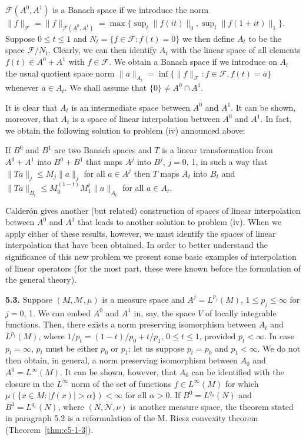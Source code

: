 $\mathcal{F}(A^{0}, A^{1})$ is a Banach space if we introduce the norm
$\|f\|_{\mathcal{F}} = \|f\|_{\mathcal{F}(A^{0}, A^{1})} = \max\{\sup_{t}\|f(it)\|_{0}, \sup_{t}\|f(1 + it)\|_{1}\}$.
Suppose $0 \leq t \leq 1$ and $N_{t} = \{f \in \mathcal{F} : f(t) = 0\}$ we
then define $A_{t}$ to be the space $\mathcal{F}/N_{t}$. Clearly, we can then
identify $A_{t}$ with the linear space of all elements
$f(t) \in A^{0} + A^{1}$ with $f \in \mathcal{F}$. We obtain a Banach space if
we introduce on $A_{t}$ the usual quotient space norm
$\|a\|_{A_{t}} = \inf\{\|f\|_{\mathcal{F}} : f \in \mathcal{F}, f(t) = a\}$
whenever $a \in A_{t}$. We shall assume that $\{0\} \neq A^{0} \cap A^{1}$.

It is clear that $A_{t}$ is an intermediate space between $A^{0}$ and $A^{1}$.
It can be shown, moreover, that $A_{t}$ is a space of linear interpolation
between $A^{0}$ and $A^{1}$. In fact, we obtain the following solution to
problem (iv) announced above:

If $B^{0}$ and $B^{1}$ are two Banach spaces and $T$ is a linear
transformation from $A^{0} + A^{1}$ into $B^{0} + B^{1}$ that maps $A^{j}$ into
$B^{j}$, $j = 0$, 1, in such a way that $\|Ta\|_{j} \leq M_{j}\|a\|_{j}$ for
all $a \in A^{j}$ then $T$ maps $A_{t}$ into $B_{t}$ and
$\|Ta\|_{B_{t}} \leq M_{0}^{(1-t)}M_{1}^{t}\|a\|_{A_{t}}$ for all
$a \in A_{t}$.

Calder\'on gives another (but related) construction of spaces of linear
interpolation between $A^{0}$ and $A^{1}$ that leads to another solution to
problem (iv). When we apply either of these results, however, we must identify
the spaces of linear interpolation that have been obtained. In order to better
understand the significance of this new problem we present some basic examples
of interpolation of linear operators (for the most part, these were known
before the formulation of the general theory).

\textbf{5.3.} Suppose $(M, \mathcal{M}, \mu)$ is a measure space and
$A^{j} = L^{p_{j}}(M)$, $1 \leq p_{j} \leq \infty$ for $j = 0$, 1. We can
embed $A^{0}$ and $A^{1}$ in, say, the space $V$ of locally integrable
functions. Then, there exists a norm preserving isomorphism between $A_{t}$ and
$L^{p_{t}}(M)$, where $1/p_{t} = (1 - t)/p_{0} + t/p_{1}$, $0 \leq t \leq 1$,
provided $p_{t} < \infty$. In case $p_{t} = \infty$, $p_{t}$ must be either
$p_{0}$ or $p_{1}$; let us suppose $p_{t} = p_{0}$ and $p_{1} < \infty$. We do
not then obtain, in general, a norm preserving isomorphism between $A_{0}$ and
$A^{0} = L^{\infty}(M)$. It can be shown, however, that $A_{0}$ can be
identified with the closure in the $L^{\infty}$ norm of the set of functions
$f \in L^{\infty}(M)$ for which
$\mu(\{x \in M : |f(x)| > \alpha\}) < \infty$ for all $\alpha > 0$. If
$B^{0} = L^{q_{0}}(N)$ and $B^{1} = L^{q_{1}}(N)$, where
$(N, \mathcal{N}, \nu)$ is another measure space, the theorem stated in
paragraph 5.2 is a reformulation of the M. Riesz convexity theorem
(Theorem~\ref{thm:c5-1-3}).

